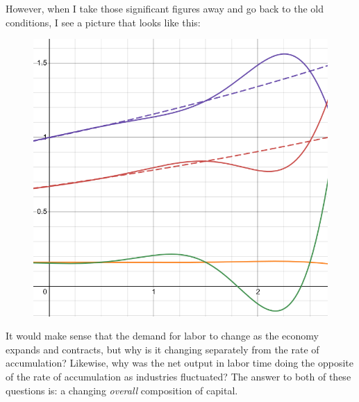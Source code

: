 \documentclass{article}
\theoremstyle{theorem}
\begin{document}
However, when I take those significant figures away and go back to the old conditions, I see a picture that looks like this:
\begin{figure}[H]
\centering
\includegraphics[scale=.7]{Images/accumulationDifferent}
\end{figure}
It would make sense that the demand for labor to change as the economy expands and contracts, but why is it changing separately from the rate of accumulation? Likewise, why was the net output in labor time doing the opposite of the rate of accumulation as industries fluctuated? The answer to both of these questions is: a changing \emph{overall} composition of capital.
\end{document}
